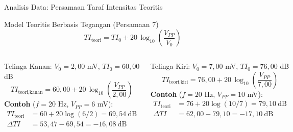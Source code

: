 \documentclass[aspectratio=169, 10pt]{beamer}
\begin{document}
	\begin{frame}{Analisis Data: Persamaan Taraf Intensitas Teoritis}
		\begin{block}{Model Teoritis Berbasis Tegangan (Persamaan 7)}
			\begin{equation*}
				TI_{\text{teori}} = TI_0 + 20\,\log_{10}\!\left(\frac{V_{PP}}{V_0}\right)
			\end{equation*}
		\end{block}

		\begin{columns}[T]
			\begin{block}{Telinga Kanan: $V_0 = 2{,}00$ mV, $TI_0 = 60{,}00$ dB}
				\footnotesize
				\begin{equation*}
					TI_{\text{teori,kanan}} = 60{,}00 + 20\,\log_{10}\!\!\left(\frac{V_{PP}}{2{,}00}\right)
				\end{equation*}
				\textbf{Contoh} ($f = 20$ Hz, $V_{PP} = 6$ mV):
				\begin{align*}
					TI_{\text{teori}} &= 60 + 20\log(6/2) = 69{,}54\ \text{dB}\\
					\Delta TI &= 53{,}47 - 69{,}54 = -16{,}08\ \text{dB}
				\end{align*}
			\end{block}

			\begin{block}{Telinga Kiri: $V_0 = 7{,}00$ mV, $TI_0 = 76{,}00$ dB}
				\footnotesize
				\begin{equation*}
					TI_{\text{teori,kiri}} = 76{,}00 + 20\,\log_{10}\!\!\left(\frac{V_{PP}}{7{,}00}\right)
				\end{equation*}
				\textbf{Contoh} ($f = 20$ Hz, $V_{PP} = 10$ mV):
				\begin{align*}
					TI_{\text{teori}} &= 76 + 20\log(10/7) = 79{,}10\ \text{dB}\\
					\Delta TI &= 62{,}00 - 79{,}10 = -17{,}10\ \text{dB}
				\end{align*}
			\end{block}
		\end{columns}
	\end{frame}
\end{document}
